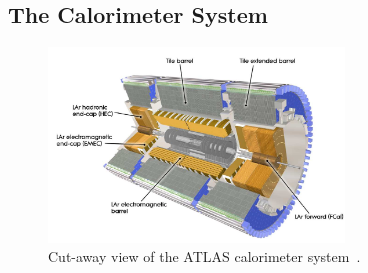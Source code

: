 



\subsection{The Calorimeter System}

\begin{figure}[tp]
     \begin{center}

            \includegraphics[width=0.7\textwidth]{figure/Calo.png}

    \end{center}
    \caption{Cut-away view of the ATLAS calorimeter system~\cite{ATLASDetector}.}



   \label{fig:atlasCal}
\end{figure}

